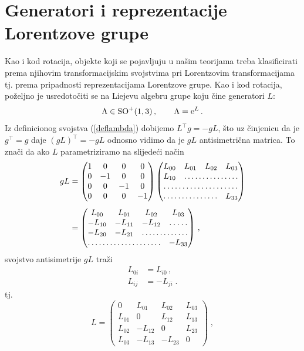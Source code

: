 \section{Generatori i reprezentacije Lorentzove grupe}
\label{sec:genLor}

Kao i kod rotacija, objekte koji se pojavljuju u našim teorijama treba klasificirati prema
njihovim transformacijskim svojstvima pri Lorentzovim transformacijama
tj. prema pripadnosti reprezentacijama Lorentzove
grupe. Kao i kod rotacija, poželjno je usredotočiti se na Liejevu algebru
grupe koju čine generatori $L$:
\begin{equation}
    \Lambda \in \mathrm{SO}^{+}(1,3) \,, \qquad \Lambda = \textrm{e}^L \,.
\end{equation}
Iz definicionog svojstva (\ref{deflambda}) dobijemo $L^\top g = -g L$,
što uz činjenicu da je $g^\top = g$ daje $(gL)^\top = -gL$ odnosno
vidimo da je $gL$ antisimetrična matrica. To znači da ako $L$
parametriziramo na slijedeći način
\begin{align}
 gL &= 
\begin{pmatrix}
1 & 0 & 0 & 0 \\
0 &-1 & 0 & 0 \\
0 & 0 &-1 & 0 \\
0 & 0 & 0 &-1
\end{pmatrix}
\begin{pmatrix}
L_{00} & L_{01} & L_{02} & L_{03}\\
L_{10} &\hdotsfor{3} \\
\hdotsfor{4} \\
\hdotsfor{3} & L_{33}
\end{pmatrix} \\[1ex]
&= 
\begin{pmatrix}
L_{00} & L_{01} & L_{02} & L_{03}\\
-L_{10} & -L_{11} & -L_{12} &\hdotsfor{1} \\
-L_{20} & -L_{21} & \hdotsfor{2} \\
\hdotsfor{3} & -L_{33}
\end{pmatrix} \,,
\end{align}
svojstvo antisimetrije $gL$ traži
\begin{align}
L_{0i} &= L_{i0} \,, \\
L_{ij} &= - L_{ji} \;.
\end{align}
tj.
\begin{equation}
 L = \begin{pmatrix}
0 & L_{01} & L_{02} & L_{03}\\
L_{01} & 0 & L_{12} & L_{13}\\
L_{02} & -L_{12} & 0& L_{23} \\
L_{03} & -L_{13} &-L_{23} & 0
\end{pmatrix} \;,
\end{equation}

